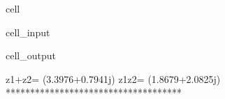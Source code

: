 \documentclass[letterpaper,10pt,english]{jupyterBook}
\begin{document}
\begin{sphinxuseclass}{cell}
\begin{sphinxVerbatimInput}
\begin{sphinxuseclass}{cell_input}
\end{sphinxuseclass}\end{sphinxVerbatimInput}
\begin{sphinxVerbatimOutput}

\begin{sphinxuseclass}{cell_output}
\begin{sphinxVerbatim}[commandchars=\\\{\}]
z1+z2= (3.3976+0.7941j)
z1\PYGZhy{}z2= (1.8679+2.0825j)
************************************
\end{sphinxVerbatim}

\noindent{}

\end{sphinxuseclass}\end{sphinxVerbatimOutput}

\end{sphinxuseclass}
\end{document}
